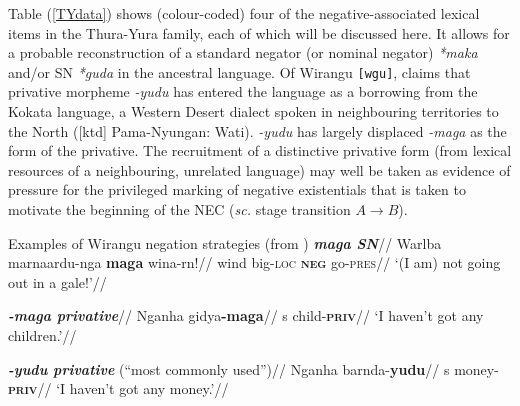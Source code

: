 \documentclass[usenames,dvipsnames,11pt]{article}
\begin{document}
{%
%		

Table (\ref{TYdata}) shows (colour-coded) four of the negative-associated lexical items in the Thura-Yura family, each of which will be discussed here. It allows for a probable reconstruction of a standard negator (or nominal negator) \textit{*maka} and/or SN \textit{*guda} in the ancestral language. Of Wirangu \texttt{[wgu]}, \citet[57]{Hercus1999} claims that privative morpheme \textit{-yudu} has entered the language as a borrowing from the Kokata language, a Western Desert dialect spoken in neighbouring territories to the North ([\gls{ktd}] Pama-Nyungan: Wati). \textit{-yudu} has largely displaced \textit{-maga} as the form of the privative. The recruitment of a distinctive privative form (from lexical resources of a neighbouring, unrelated language) may well be taken as evidence of pressure for the privileged marking of negative existentials that is taken to motivate the beginning of the NEC (\textit{sc.} stage transition $A\to B$).



\pex Examples of Wirangu negation strategies (from \citealt{Hercus1999})\label{wgu-exx}
\a\begingl\glpreamble \textbf{\em{maga} SN}//
\gla Warlba marnaardu-nga \textbf{maga} wina-rn!//
\glb wind big\textsc{-loc} \textsc{\textbf{neg}} go\textsc{-pres}//
\glft `(I am) not going out in a gale!'//\endgl

\a\begingl\glpreamble \textbf{\em{-maga} privative}//
\gla Nganha gidya\textbf{-maga}//
\gls{s} child-\textsc{\textbf{priv}}//
\glft`I haven't got any children.'//\endgl

\a\begingl
\glpreamble\textbf{ \em{-yudu} privative }(``most commonly used'')//
\gla Nganha barnda-\textbf{yudu}//
\gls{s} money-\textsc{\textbf{priv}}//
\glft`I haven't got any money.'//\endgl

}
\end{document}
